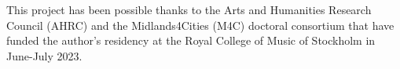\documentclass{article}
\begin{document}
   

 
	\begin{acknowledgments}
    This project has been possible thanks to the Arts and Humanities Research Council (AHRC) and the Midlands4Cities (M4C) doctoral consortium that have funded the author's residency at the Royal College of Music of Stockholm in June-July 2023.
	\end{acknowledgments} 
	
	
	
\end{document}
